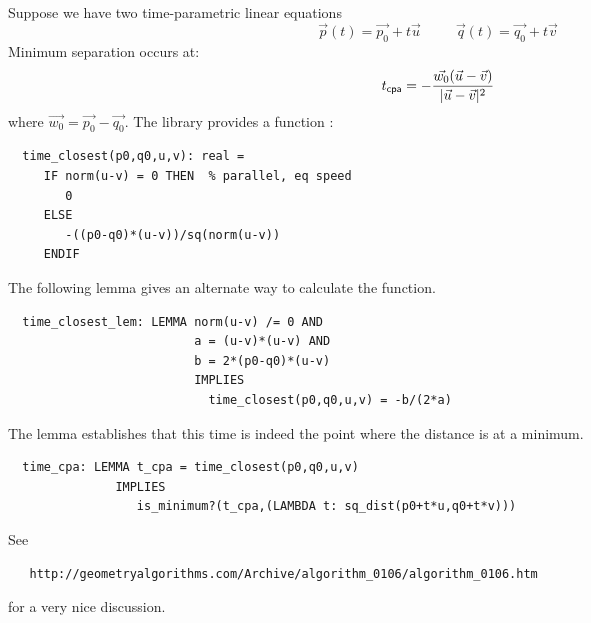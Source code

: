\documentclass[12pt]{article}
\begin{document}
Suppose we have two time-parametric linear equations 
\[
   \vec{p}(t) = \vec{p_0} + t \vec{u} \;\;\;    \;\;\;    \;\;\;   
   \vec{q}(t) = \vec{q_0} + t \vec{v}     
\]
Minimum separation occurs at:
\[
    t_{{\sf cpa}} = -\frac{\vec{w_0}(\vec{u}-\vec{v})}{|\vec{u}-\vec{v}|^2}
\]
where $\vec{w_0} = \vec{p_0} - \vec{q_0}$.
The library provides a function : 
\begin{verbatim}
  time_closest(p0,q0,u,v): real = 
     IF norm(u-v) = 0 THEN  % parallel, eq speed
        0
     ELSE
        -((p0-q0)*(u-v))/sq(norm(u-v))
     ENDIF 
\end{verbatim}
The following lemma gives an alternate way to calculate the function.
\begin{verbatim}
  time_closest_lem: LEMMA norm(u-v) /= 0 AND
                          a = (u-v)*(u-v) AND
                          b = 2*(p0-q0)*(u-v) 
                          IMPLIES
                            time_closest(p0,q0,u,v) = -b/(2*a)
\end{verbatim}
The lemma  establishes that this time is indeed the
point where the distance is at a minimum. 
\begin{verbatim}
  time_cpa: LEMMA t_cpa = time_closest(p0,q0,u,v) 
               IMPLIES
                  is_minimum?(t_cpa,(LAMBDA t: sq_dist(p0+t*u,q0+t*v))) 
\end{verbatim}
See
\begin{verbatim}
   http://geometryalgorithms.com/Archive/algorithm_0106/algorithm_0106.htm
\end{verbatim}
for a very nice discussion.
\end{document}

